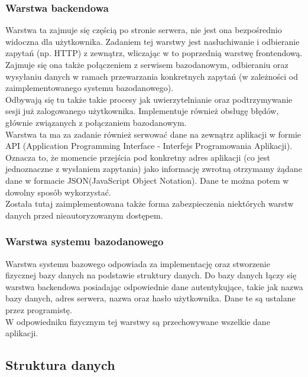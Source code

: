 \documentclass[eng,printmode]{mgr}
\begin{document}
\subsubsection{Warstwa backendowa}
Warstwa ta zajmuje się częścią po stronie serwera, nie jest ona bezpośrednio widoczna dla użytkownika. Zadaniem tej warstwy jest nasłuchiwanie i odbieranie zapytań (np. HTTP) z zewnątrz, wliczając w to poprzednią warstwę frontendową. Zajmuje się ona także połączeniem z serwisem bazodanowym, odbieraniu oraz wysyłaniu danych w ramach przewarzania konkretnych zapytań (w zależności od zaimplementowanego systemu bazodanowego).
\\
Odbywają się tu także takie procesy jak uwierzytelnianie oraz podtrzymywanie sesji już zalogowanego użytkownika. Implementuje również obsługę błędów, głównie związanych z połączaniem bazodanowym.
\\
Warstwa ta ma za zadanie również serwować dane na zewnątrz aplikacji w formie API (Application Programming Interface - Interfejs Programowania Aplikacji)\cite{API}. Oznacza to, że momencie przejścia pod konkretny adres aplikacji (co jest jednoznaczne z wysłaniem zapytania) jako informację zwrotną otrzymamy żądane dane w formacie JSON(JavaScript Object Notation)\cite {JSON}. Dane te można potem w dowolny sposób wykorzystać.
\\
Została tutaj zaimplementowana także forma zabezpieczenia niektórych warstw danych przed nieautoryzowanym dostępem.
\subsubsection{Warstwa systemu bazodanowego}
Warstwa systemu bazowego odpowiada za implementację oraz stworzenie fizycznej bazy danych na podstawie struktury danych. Do bazy danych łączy się warstwa backendowa posiadając odpowiednie dane autentykujące, takie jak nazwa bazy danych, adres serwera, nazwa oraz hasło użytkownika. Dane te są ustalane przez programistę.
\\
W odpowiedniku fizycznym tej warstwy są przechowywane wszelkie dane aplikacji.

\subsection{Struktura danych}
\end{document}
